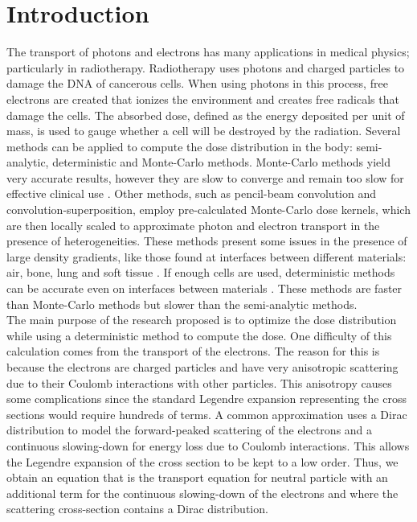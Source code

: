 \section{Introduction}
The transport of photons and electrons has many applications in medical
physics; particularly in radiotherapy. Radiotherapy uses photons and
charged particles to damage the DNA of cancerous cells. When using photons in
this process, free electrons are created that ionizes the environment and creates 
free radicals that damage the cells. The absorbed dose, defined as the energy 
deposited per unit of mass, is used to gauge whether a cell will be destroyed
by the radiation. Several methods can be applied to compute the dose distribution
in the body: semi-analytic, deterministic and Monte-Carlo
methods. Monte-Carlo methods yield very accurate results, however they are
slow to converge and remain too slow for effective clinical use
\cite{acuros}. Other methods, such as pencil-beam convolution and
convolution-superposition, employ pre-calculated Monte-Carlo dose kernels,
which are then locally scaled to approximate photon and electron transport in
the presence of heterogeneities. These methods present some issues in the
presence of large density gradients, like those found at interfaces between
different materials: air, bone, lung and soft tissue
\cite{acuros,seco,krieger}. If enough cells are used, deterministic methods
can be accurate even on interfaces between materials \cite{acuros}. These
methods are faster than Monte-Carlo methods but slower than the semi-analytic
methods.\\
The main purpose of the research proposed is to optimize the dose distribution
while using a deterministic method to compute the dose. One difficulty of this
calculation comes from the transport of the electrons. The reason for this is
because the electrons
are charged particles and have very anisotropic scattering due
to their Coulomb interactions with other particles. This
anisotropy causes some complications since the standard Legendre expansion
representing the cross sections would require hundreds of terms.  A common
approximation uses a Dirac distribution to model the forward-peaked
scattering of the electrons and a continuous slowing-down for energy loss due
to Coulomb interactions. This allows the Legendre expansion of the cross
section to be kept to a low order. Thus, we obtain an equation that is the
transport equation for neutral particle with an additional term for the
continuous slowing-down of the electrons and where the scattering
cross-section contains a Dirac distribution.\\
